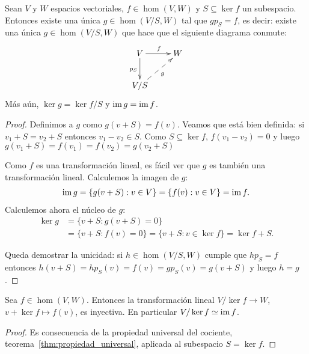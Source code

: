 \begin{thm}
    \label{thm:propiedad_universal}
    Sean $V$ y $W$ espacios vectoriales, $f\in\hom(V,W)$ y $S\subseteq\ker f $
    un subespacio. Entonces existe una única $g\in\hom(V/S,W)$ tal que
    $gp_S=f$, es decir: existe una única $g\in\hom(V/S,W)$ que hace que el
    siguiente diagrama conmute:
    \[
    \xymatrix{ V\ar[r]^f\ar[d]_{p_S} & W\\ V/S\ar@{-->}[ru]_g & }
    \]
    Más aún, $\ker g=\ker f/S$ y
    $\operatorname{im} g=\operatorname{im} f$.

    \begin{proof}
        Definimos a $g$ como $g(v+S)=f(v)$. Veamos que está bien definida: si
        $v_1+S=v_2+S$ entonces $v_1-v_2\in S$. Como $S\subseteq\ker f$,
        $f(v_1-v_2)=0$ y luego $g(v_1+S)=f(v_1)=f(v_2)=g(v_2+S)$

        Como $f$ es una transformación lineal, es fácil ver que $g$ es también
        una transformación lineal. 
        Calculemos la imagen de $g$: 
        \begin{align*}
            \operatorname{im} g=\{g(v+S):v\in V\}=\{f(v):v\in V\}=\operatorname{im} f.
        \end{align*}
        Calculemos ahora el núcleo de $g$:
        \begin{align*}
            \ker g&=\{v+S:g(v+S)=0\}\\
            &=\{v+S:f(v)=0\}=\{v+S:v\in\ker f\}=\ker f+S.
        \end{align*}

        Queda demostrar la unicidad: si $h\in\hom(V/S,W)$ cumple que $hp_S=f$
        entonces $h(v+S)=hp_S(v)=f(v)=gp_S(v)=g(v+S)$ y luego $h=g$.
    \end{proof}
\end{thm}

\begin{cor}
    Sea $f\in\hom(V,W)$. Entonces la transformación lineal $V/\ker f\to W$,
    $v+\ker f\mapsto f(v)$, es inyectiva. En particular $V/\ker f\simeq \operatorname{im} f$.

    \begin{proof}
        Es consecuencia de la propiedad universal del cociente,
        teorema~\ref{thm:propiedad_universal}, aplicada al subespacio $S=\ker
        f$.
    \end{proof}
\end{cor}

